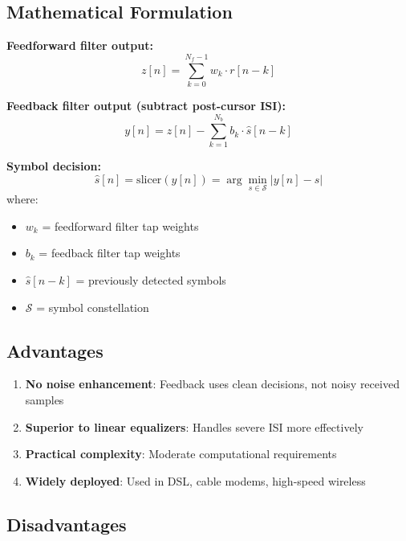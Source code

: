 \subsection{Mathematical Formulation}

\textbf{Feedforward filter output:}
\begin{equation}
z[n] = \sum_{k=0}^{N_f-1} w_k \cdot r[n-k]
\label{eq:dfe-ff}
\end{equation}

\textbf{Feedback filter output (subtract post-cursor ISI):}
\begin{equation}
y[n] = z[n] - \sum_{k=1}^{N_b} b_k \cdot \hat{s}[n-k]
\label{eq:dfe-fb}
\end{equation}

\textbf{Symbol decision:}
\begin{equation}
\hat{s}[n] = \text{slicer}(y[n]) = \arg\min_{s \in \mathcal{S}} |y[n] - s|
\label{eq:dfe-decision}
\end{equation}
where:
\begin{itemize}
\item $w_k$ = feedforward filter tap weights
\item $b_k$ = feedback filter tap weights
\item $\hat{s}[n-k]$ = previously detected symbols
\item $\mathcal{S}$ = symbol constellation
\end{itemize}

\subsection{Advantages}

\begin{enumerate}
\item \textbf{No noise enhancement}: Feedback uses clean decisions, not noisy received samples
\item \textbf{Superior to linear equalizers}: Handles severe ISI more effectively
\item \textbf{Practical complexity}: Moderate computational requirements
\item \textbf{Widely deployed}: Used in DSL, cable modems, high-speed wireless
\end{enumerate}

\subsection{Disadvantages}

